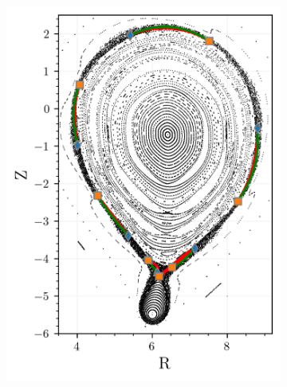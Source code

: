 \begin{figure}[H]
    \centering
    \begin{minipage}[c]{0.55\textwidth} %
        \centering
        \begin{subfigure}[b]{\textwidth}
            \centering
            \includegraphics[width=\textwidth]{images/turnstile/coutour_fwd.png}
            \caption{}
            \label{fig:flux-poincare-conv-a}
        \end{subfigure}
    \end{minipage}
    \hfill
    \begin{minipage}[c]{0.42\textwidth} %
        \centering
        \begin{subfigure}[b]{0.95\textwidth}
            \centering

\end{subfigure}
\end{minipage}
\end{figure}
